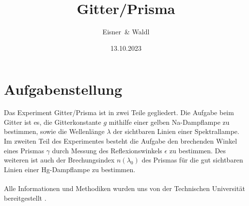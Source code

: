 \documentclass[12pt,a4paper,twoside]{article}
\begin{document}
\newcommand\laboratorynumber{2}
\title{Gitter/Prisma}
\newcommand\supervisor{Weis, Valentin}
\newcommand\groupnumber{42}

\newcommand\participantonelastname{Eisner}
\newcommand\participantonefirstname{Nico}
\newcommand\participantoneid{12214121}
\newcommand\participanttwolastname{Waldl}
\newcommand\participanttwofirstname{Philip}
\newcommand\participanttwoid{12214120}
\author{\participantonelastname \ \& \participanttwolastname}

\newcommand\degreeid{UB 033 678}
\newcommand\semester{23WS}
\date{13.10.2023}

\newcommand\coursetitle{Laborübungen 2: \\ Elektrizität, Magnetismus, Optik}

%



\tableofcontents
\newpage

\section{Aufgabenstellung} %
Das Experiment Gitter/Prisma ist in zwei Teile gegliedert. Die Aufgabe beim Gitter ist es, die Gitterkonstante $g$ mithilfe einer gelben Na-Dampflampe zu bestimmen, sowie die Wellenlänge $\lambda$ der sichtbaren Linien einer Spektrallampe. 
\\
Im zweiten Teil des Experimentes besteht die Aufgabe den brechenden Winkel eines Prismas $\gamma$ durch Messung des Reflexionswinkels $\epsilon$ zu bestimmen. 
Des weiteren ist auch der Brechungsindex $n(\lambda_0)$ des Prismas für die gut sichtbaren Linien einer Hg-Dampflampe zu bestimmen. 
\\
\\
Alle Informationen und Methodiken wurden uns von der Technischen Universität bereitgestellt \cite{teachcenter2}. 
\end{document}
